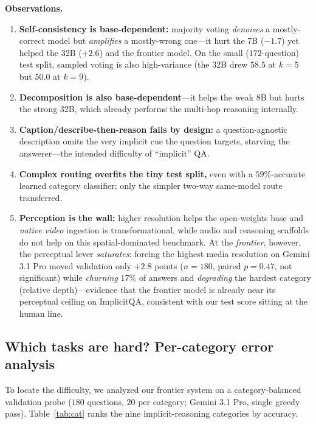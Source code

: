 \documentclass[10pt,twocolumn,letterpaper]{article}
\begin{document}
\noindent\textbf{Observations.}
\begin{enumerate}[leftmargin=1.2em,itemsep=1pt]
  \item \textbf{Self-consistency is base-dependent:} majority voting \emph{denoises} a mostly-correct
  model but \emph{amplifies} a mostly-wrong one---it hurt the 7B ($-1.7$) yet helped the 32B ($+2.6$)
  and the frontier model. On the small ($172$-question) test split, sampled voting is also
  high-variance (the 32B drew $58.5$ at $k{=}5$ but $50.0$ at $k{=}9$).
  \item \textbf{Decomposition is also base-dependent}---it helps the weak 8B but hurts the strong 32B,
  which already performs the multi-hop reasoning internally.
  \item \textbf{Caption/describe-then-reason fails by design:} a question-agnostic description omits the
  very implicit cue the question targets, starving the answerer---the intended difficulty of
  ``implicit'' QA.
  \item \textbf{Complex routing overfits the tiny test split,} even with a $59\%$-accurate learned
  category classifier; only the simpler two-way same-model route transferred.
  \item \textbf{Perception is the wall:} higher resolution helps the open-weights base and \emph{native
  video} ingestion is transformational, while audio and reasoning scaffolds do not help on this
  spatial-dominated benchmark. At the \emph{frontier}, however, the perceptual lever \emph{saturates}:
  forcing the highest media resolution on Gemini 3.1 Pro moved validation only $+2.8$ points
  ($n{=}180$, paired $p{=}0.47$, not significant) while \emph{churning} $17\%$ of answers and
  \emph{degrading} the hardest category (relative depth)---evidence that the frontier model is already
  near its perceptual ceiling on ImplicitQA, consistent with our test score sitting at the human line.
\end{enumerate}

\subsection{Which tasks are hard? Per-category error analysis}
To locate the difficulty, we analyzed our frontier system on a category-balanced validation probe
($180$ questions, $20$ per category; Gemini 3.1 Pro, single greedy pass). Table~\ref{tab:cat} ranks the
nine implicit-reasoning categories by accuracy.
\end{document}
